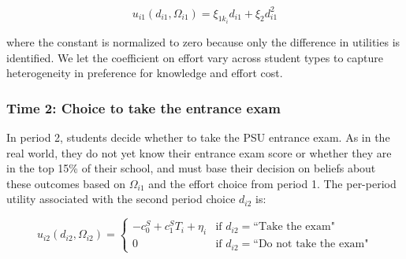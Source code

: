 \begin{equation}\label{eq:ut1}
    u_{i1}(d_{i1},\Omega_{i1})=\xi_{1k_i} d_{i1}+\xi_2d_{i1}^2
\end{equation}

\noindent where the constant is normalized to zero because only the difference in utilities is identified. We let the coefficient on effort vary across student types to capture heterogeneity in preference for knowledge and effort cost.







\subsubsection{Time 2: Choice to take the entrance exam}\label{sec:model_time_2}
In period 2, students decide whether to take the PSU entrance exam. As in the real world, they do not yet know their entrance exam score or whether they are in the top 15\% of their school, and must base their decision on beliefs about these outcomes based on $\Omega_{i1}$ and the effort choice from period 1. The per-period utility associated with the second period choice $d_{i2}$ is:


\begin{equation}\label{eq:ut_PSU}
u_{i2}(d_{i2},\Omega_{i2}) = 
\begin{cases}
   -c_{0}^S+c_1^S T_i+\eta_i  & \text{if } d_{i2}=\mbox{``Take the exam"}\\
        0                                  & \text{if } d_{i2}=\mbox{``Do not take the exam"}
    \end{cases}                                                                                                 
\end{equation}



